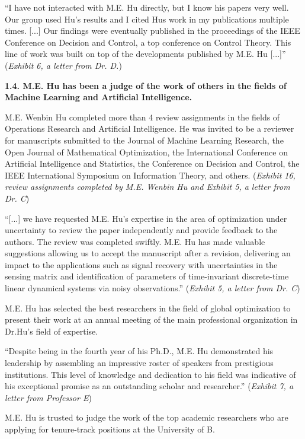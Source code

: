 \documentclass{article}
\begin{document}
“I have not interacted with M.E. Hu directly, but I know his papers very well. Our group used Hu's results and I cited Hus work in my publications multiple times.  [...] Our findings were eventually published in the proceedings of the IEEE Conference on Decision and Control, a top conference on Control Theory. This line of work was built on top of the developments published by M.E. Hu [...]” ({\it Exhibit 6, a letter from Dr. D.})


{\bf 1.4. M.E. Hu has been a judge of the work of others in the fields of Machine Learning and Artificial Intelligence. }

M.E. Wenbin Hu completed more than 4 review assignments in the fields of Operations Research and Artificial Intelligence. He was invited to be a reviewer for manuscripts submitted to the Journal of Machine Learning Research, the Open Journal of Mathematical Optimization, the International Conference on Artificial Intelligence and Statistics, the Conference on Decision and Control, the IEEE International Symposium on Information Theory, and others. ({\it Exhibit 16, review assignments completed by M.E. Wenbin Hu and Exhibit 5, a letter from Dr. C})

“[...] we have requested M.E. Hu’s expertise in the area of optimization under uncertainty to review the paper independently and provide feedback to the authors. The review was completed swiftly. M.E. Hu has made valuable suggestions allowing us to accept the manuscript after a revision, delivering an impact to the applications such as signal recovery with uncertainties in the sensing matrix and identification of parameters of time-invariant discrete-time linear dynamical systems via noisy observations.” ({\it Exhibit 5, a letter from Dr. C}) 

M.E. Hu has selected the best researchers in the field of global optimization to present their work at an annual meeting of the main professional organization in Dr.Hu's field of expertise.

“Despite being in the fourth year of his Ph.D., M.E. Hu demonstrated his leadership by assembling an impressive roster of speakers from prestigious institutions. This level of knowledge and dedication to his field was indicative of his exceptional promise as an outstanding scholar and researcher.” ({\it Exhibit 7, a letter from Professor E}) 

M.E. Hu is trusted to judge the work of the top academic researchers who are applying for tenure-track positions at the University of B.
\end{document}
